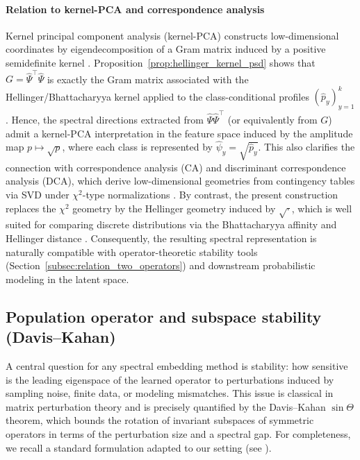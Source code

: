 \documentclass[preprint,11pt]{elsarticle}
\begin{document}
\paragraph{Relation to kernel-PCA and correspondence analysis}
Kernel principal component analysis (kernel-PCA) constructs low-dimensional coordinates by eigendecomposition of a Gram matrix induced by a
positive semidefinite kernel \cite{Scholkopf1998}. Proposition~\ref{prop:hellinger_kernel_psd} shows that
$G=\widehat\Psi^\top\widehat\Psi$ is exactly the Gram matrix associated with the Hellinger/Bhattacharyya kernel applied to the
class-conditional profiles $(\widehat p_y)_{y=1}^k$. Hence, the spectral directions extracted from $\widehat\Psi\widehat\Psi^\top$
(or equivalently from $G$) admit a kernel-PCA interpretation in the feature space induced by the amplitude map $p\mapsto\sqrt{p}$, where each
class is represented by $\widehat\psi_y=\sqrt{\widehat p_y}$. This also clarifies the connection with correspondence analysis (CA) and
discriminant correspondence analysis (DCA), which derive low-dimensional geometries from contingency tables via SVD under $\chi^2$-type
normalizations \cite{Greenacre1984,DCA}. By contrast, the present construction replaces the $\chi^2$ geometry by the Hellinger geometry induced
by $\sqrt{\cdot}$, which is well suited for comparing discrete distributions via the Bhattacharyya affinity and Hellinger distance
\cite{Bhattacharyya1943,Aherne1998}. Consequently, the resulting spectral representation is naturally compatible with
operator-theoretic stability tools (Section~\ref{subsec:relation_two_operators}) and downstream probabilistic modeling in the latent space.

\subsection{Population operator and subspace stability (Davis--Kahan)}
\label{subsec:davis_kahan_stability}

A central question for any spectral embedding method is stability: how sensitive is the leading eigenspace of the
learned operator to perturbations induced by sampling noise, finite data, or modeling mismatches.
This issue is classical in matrix perturbation theory and is precisely quantified by the Davis--Kahan $\sin\Theta$ theorem,
which bounds the rotation of invariant subspaces of symmetric operators in terms of the perturbation size and a spectral gap.
For completeness, we recall a standard formulation adapted to our setting (see \cite{DavisKahan1970,YuWangSamworth2015}).
\end{document}
